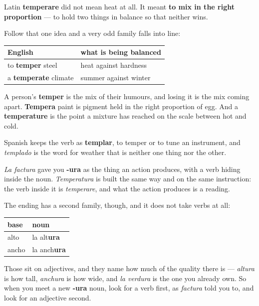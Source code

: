 \begin{cousinweb}
Latin \textbf{temperare} did not mean heat at all. It meant \textbf{to mix in the right proportion} — to hold two things in balance so that neither wins.

Follow that one idea and a very odd family falls into line:

\noindent
\begin{tabularx}{\linewidth}{@{}>{\raggedright\arraybackslash}X>{\raggedright\arraybackslash}X@{}}
\toprule
\textbf{English} & \textbf{what is being balanced} \\
\midrule
to \textbf{temper} steel & heat against hardness \\
a \textbf{temperate} climate & summer against winter \\
\bottomrule
\end{tabularx}

A person's \textbf{temper} is the mix of their humours, and losing it is the mix coming apart. \textbf{Tempera} paint is pigment held in the right proportion of egg. And a \textbf{temperature} is the point a mixture has reached on the scale between hot and cold.

Spanish keeps the verb as \textbf{templar}, to temper or to tune an instrument, and \emph{templado} is the word for weather that is neither one thing nor the other.
\end{cousinweb}

\begin{grammarlens}[title={Grammar Lens: -ura has two jobs}]
\emph{La factura} gave you \textbf{-ura} as the thing an action produces, with a verb hiding inside the noun. \emph{Temperatura} is built the same way and on the same instruction: the verb inside it is \emph{temperare}, and what the action produces is a reading.

The ending has a second family, though, and it does not take verbs at all:

\noindent
\begin{tabularx}{\linewidth}{@{}>{\raggedright\arraybackslash}X>{\raggedright\arraybackslash}X@{}}
\toprule
\textbf{base} & \textbf{noun} \\
\midrule
alto & la alt\textbf{ura} \\
ancho & la anch\textbf{ura} \\
\bottomrule
\end{tabularx}

Those sit on adjectives, and they name how much of the quality there is — \emph{altura} is how tall, \emph{anchura} is how wide, and \emph{la verdura} is the one you already own. So when you meet a new \textbf{-ura} noun, look for a verb first, as \emph{factura} told you to, and look for an adjective second.
\end{grammarlens}

